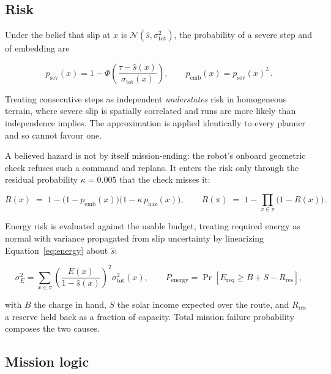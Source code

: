 \documentclass[11pt]{article}
\begin{document}
\subsection{Risk}

Under the belief that slip at $x$ is $\mathcal{N}(\hat{s}, \sigma_{\mathrm{tot}}^2)$,
the probability of a severe step and of embedding are

\begin{equation}
  p_{\mathrm{sev}}(x) = 1 - \Phi\!\left(\frac{\tau - \hat{s}(x)}{\sigma_{\mathrm{tot}}(x)}\right),
  \qquad
  p_{\mathrm{emb}}(x) = p_{\mathrm{sev}}(x)^{L}.
  \label{eq:embed}
\end{equation}

Treating consecutive steps as independent \emph{understates} risk in
homogeneous terrain, where severe slip is spatially correlated and runs are
more likely than independence implies. The approximation is applied identically
to every planner and so cannot favour one.

A believed hazard is not by itself mission-ending: the robot's onboard
geometric check refuses such a command and replans. It enters the risk only
through the residual probability $\kappa = 0.005$ that the check misses it:

\begin{equation}
  R(x) \;=\; 1 - \bigl(1 - p_{\mathrm{emb}}(x)\bigr)\bigl(1 - \kappa\, p_{\mathrm{haz}}(x)\bigr),
  \qquad
  R(\pi) \;=\; 1 - \prod_{x \in \pi}\bigl(1 - R(x)\bigr).
  \label{eq:risk}
\end{equation}

Energy risk is evaluated against the usable budget, treating required energy as
normal with variance propagated from slip uncertainty by linearizing
Equation~\ref{eq:energy} about $\hat{s}$:

\begin{equation}
  \sigma_E^2 = \sum_{x \in \pi} \left(\frac{E(x)}{1 - \hat{s}(x)}\right)^{2}\!\sigma_{\mathrm{tot}}^2(x),
  \qquad
  P_{\mathrm{energy}} = \Pr\!\left[E_{\mathrm{req}} \ge B + S - R_{\mathrm{res}}\right],
  \label{eq:energyrisk}
\end{equation}

with $B$ the charge in hand, $S$ the solar income expected over the route, and
$R_{\mathrm{res}}$ a reserve held back as a fraction of capacity. Total mission
failure probability composes the two causes.

\subsection{Mission logic}
\end{document}
